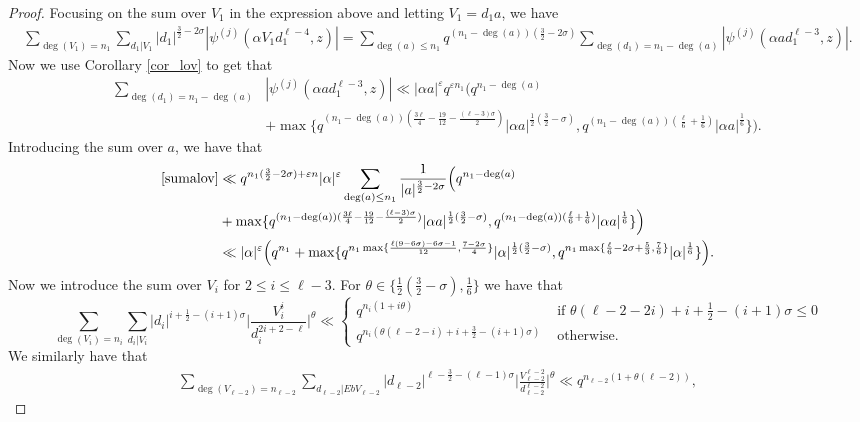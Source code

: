 \documentclass[12pt]{amsart}
\begin{document}
\begin{proof}
Focusing on the sum over $V_1$ in the expression above and letting $V_1=d_1a$, we have
\begin{align}
\label{sumalov}
\sum_{\deg(V_1)=n_1} \sum_{d_1|V_1}|d_1|^{\frac{3}{2}-2\sigma} |\psi^{(j)}(\alpha V_1 d_1^{\ell-4},z) | = \sum_{\deg(a) \leq n_1} q^{(n_1-\deg(a))(\frac{3}{2}-2\sigma)} \sum_{\deg(d_1)=n_1-\deg(a)} |\psi^{(j)}(\alpha a d_1^{\ell-3} ,z)|.
\end{align}
Now we use Corollary \ref{cor_lov} to get that 
\begin{align*}
\sum_{\deg(d_1)=n_1-\deg(a)}&  |\psi^{(j)}(\alpha a d_1^{\ell-3} ,z)| \ll |\alpha a|^{\varepsilon} q^{\varepsilon n_1} \Big( q^{n_1-\deg(a)}  \\
&+ \max \{ q^{(n_1-\deg(a))(\frac{3\ell}{4} - \frac{19}{12} - \frac{(\ell-3)\sigma}{2})} |\alpha a|^{\frac{1}{2}( \frac{3}{2} -\sigma)} , q^{(n_1-\deg(a))(\frac{\ell}{6}+\frac{1}{6})} |\alpha a|^{\frac{1}{6}}\} \Big) .
\end{align*}
Introducing the sum over $a$, we have that
\begin{align*}
\eqref{sumalov} &\ll q^{n_1(\frac{3}{2}-2\sigma)+\varepsilon n} |\alpha|^{\varepsilon} \sum_{\deg(a) \leq n_1} \frac{1}{|a|^{\frac{3}{2}-2\sigma}} \Big( q^{n_1-\deg(a)}  \\
&+ \max \{ q^{(n_1-\deg(a))(\frac{3\ell}{4} - \frac{19}{12} - \frac{(\ell-3)\sigma}{2})} |\alpha a|^{\frac{1}{2}( \frac{3}{2} -\sigma)} , q^{(n_1-\deg(a))(\frac{\ell}{6}+\frac{1}{6})} |\alpha a|^{\frac{1}{6}}\} \Big) \\
& \ll |\alpha|^{\varepsilon} \Big( q^{n_1} + \max\{ q^{n_1 \max\{ \frac{\ell(9-6\sigma)-6\sigma-1}{12} , \frac{7-2\sigma}{4} \}} |\alpha|^{\frac{1}{2}(\frac{3}{2}-\sigma)}, q^{n_1 \max\{ \frac{\ell}{6}-2\sigma+\frac{5}{3}, \frac{7}{6} \}} |\alpha|^{\frac{1}{6}}\} \Big).
\end{align*}
Now we introduce the sum over $V_i$ for $2 \leq i  \leq \ell-3$. For $\theta \in \{ \frac{1}{2}\left(\frac{3}{2}-\sigma\right), \frac{1}{6}\}$  we have that
$$
\sum_{\deg(V_i) =n_i}   \sum_{d_i|V_i} |d_i|^{i+\frac{1}{2}- (i+1)\sigma} \Big| \frac{V_i^i}{d_i^{2i+2-\ell}} \Big|^{\theta}   \ll
\begin{cases}
q^{n_i(1+i\theta)} & \mbox{ if } \theta(\ell-2-2i)+i+\frac{1}{2} -(i+1)\sigma \leq 0 \\
q^{n_i(\theta(\ell-2-i)+i+\frac{3}{2}-(i+1)\sigma)} & \mbox{ otherwise.}
\end{cases}
$$
We similarly have that
\begin{align*}
\sum_{\deg(V_{\ell-2})=n_{\ell-2}} \sum_{d_{\ell-2}|EbV_{\ell-2}} |d_{\ell-2}|^{\ell-\frac{3}{2}-(\ell-1)\sigma} \Big|\frac{ V_{\ell-2}^{\ell-2}}{d_{\ell-2}^{\ell-2}} \Big|^{\theta} \ll q^{n_{\ell-2}(1+\theta (\ell-2))},

\end{align*}
\end{proof}
\end{document}
